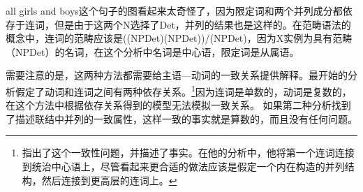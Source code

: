 all girls and boys这个句子的图看起来太奇怪了，因为限定词和两个并列成分都依存于连词，但是由于这两个N选择了Det，并列的结果也是这样的。在范畴语法的概念中，连词的范畴应该是((NP\bs Det)\bs (NP\bs Det))/(NP\bs Det)，因为X实例为具有范畴（NP\bs Det）的名词，在这个分析中名词是中心语，限定词是从属语。

需要注意的是，这两种方法都需要给主语—动词的一致关系提供解释。\tes 最开始的分析假定了动词和连词之间有两种依存关系。\footnote{
\citet[]{Eroms2000a}指出了这个一致性问题，并描述了事实。在他的分析中，他将第一个连词连接到统治中心语上，尽管看起来更合适的做法应该是假定一个内在构造的并列结构，然后连接到更高层的连词上。
}因为连词是单数的，动词是复数的，在这个方法中根据依存关系得到的模型无法模拟一致关系。
如果第二种分析找到了描述联结中并列的一致属性，这样一致的事实就是算数的，而且没有任何问题。

